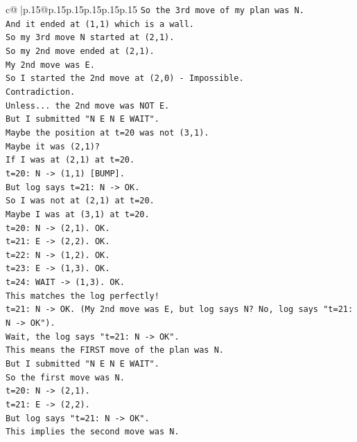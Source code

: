 \documentclass{article}
\begin{document}
{\begin{supertabular}{c@{$\;$}|p{.15\linewidth}@{}p{.15\linewidth}p{.15\linewidth}p{.15\linewidth}p{.15\linewidth}p{.15\linewidth}}
{{{\texttt{So the 3rd move of my plan was N.} \\
\texttt{And it ended at (1,1) which is a wall.} \\
\texttt{So my 3rd move N started at (2,1).} \\
\texttt{So my 2nd move ended at (2,1).} \\
\texttt{My 2nd move was E.} \\
\texttt{So I started the 2nd move at (2,0) {-} Impossible.} \\
\texttt{Contradiction.} \\
\texttt{Unless... the 2nd move was NOT E.} \\
\texttt{But I submitted "N E N E WAIT".} \\
\texttt{Maybe the position at t=20 was not (3,1).} \\
\texttt{Maybe it was (2,1)?} \\
\texttt{If I was at (2,1) at t=20.} \\
\texttt{t=20: N {-}> (1,1) {[}BUMP{]}.} \\
\texttt{But log says t=21: N {-}> OK.} \\
\texttt{So I was not at (2,1) at t=20.} \\
\texttt{Maybe I was at (3,1) at t=20.} \\
\texttt{t=20: N {-}> (2,1). OK.} \\
\texttt{t=21: E {-}> (2,2). OK.} \\
\texttt{t=22: N {-}> (1,2). OK.} \\
\texttt{t=23: E {-}> (1,3). OK.} \\
\texttt{t=24: WAIT {-}> (1,3). OK.} \\
\texttt{This matches the log perfectly!} \\
\texttt{t=21: N {-}> OK. (My 2nd move was E, but log says N? No, log says "t=21: N {-}> OK").} \\
\texttt{Wait, the log says "t=21: N {-}> OK".} \\
\texttt{This means the FIRST move of the plan was N.} \\
\texttt{But I submitted "N E N E WAIT".} \\
\texttt{So the first move was N.} \\
\texttt{t=20: N {-}> (2,1).} \\
\texttt{t=21: E {-}> (2,2).} \\
\texttt{But log says "t=21: N {-}> OK".} \\
\texttt{This implies the second move was N.} \\
}}}
\end{supertabular}}
\end{document}
